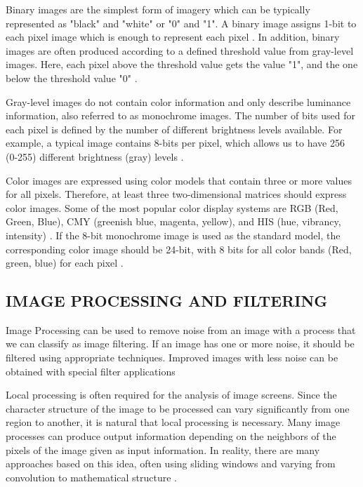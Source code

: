 Binary images are the simplest form of imagery which can be typically represented as "black" and "white" or "0" and "1". A binary image assigns 1-bit to each pixel image which is enough to represent each pixel \cite{umbaugh2005computer, costa2000shape}. In addition, binary images are often produced according to a defined threshold value from gray-level images. Here, each pixel above the threshold value gets the value "1", and the one below the threshold value "0" \cite{umbaugh2005computer, costa2000shape}.

Gray-level images do not contain color information and only describe luminance information, also referred to as monochrome images. The number of bits used for each pixel is defined by the number of different brightness levels available. For example, a typical image contains 8-bits per pixel, which allows us to have 256 (0-255) different brightness (gray) levels \cite{umbaugh2005computer, costa2000shape}.

Color images are expressed using color models that contain three or more values for all pixels. Therefore, at least three two-dimensional matrices should express color images. Some of the most popular color display systems are RGB (Red, Green, Blue), CMY (greenish blue, magenta, yellow), and HIS (hue, vibrancy, intensity) \cite{costa2000shape}. If the 8-bit monochrome image is used as the standard model, the corresponding color image should be 24-bit, with 8 bits for all color bands (Red, green, blue) for each pixel \cite{umbaugh2005computer}.

\subsection{IMAGE PROCESSING AND FILTERING}

Image Processing can be used to remove noise from an image with a process that we can classify as image filtering. If an image has one or more noise, it should be filtered using appropriate techniques. Improved images with less noise can be obtained with special filter applications \cite{costa2000shape}

Local processing is often required for the analysis of image screens. Since the character structure of the image to be processed can vary significantly from one region to another, it is natural that local processing is necessary. Many image processes can produce output information depending on the neighbors of the pixels of the image given as input information. In reality, there are many approaches based on this idea, often using sliding windows and varying from convolution to mathematical structure \cite{costa2000shape}.

